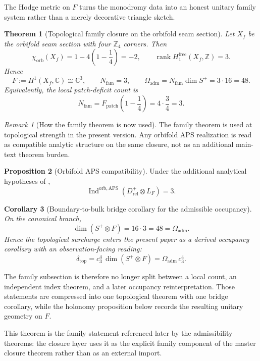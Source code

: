 \documentclass[11pt,a4paper]{article}
\newtheorem{theorem}{Theorem}[section]
\newtheorem{corollary}[theorem]{Corollary}
\theoremstyle{definition}
\newtheorem{proposition}[theorem]{Proposition}
\theoremstyle{remark}
\newtheorem*{remark}{Remark}
\DeclareMathOperator{\rank}{rank}
\DeclareMathOperator{\Ind}{Ind}
\newcommand{\cthree}{c_3}
\newcommand{\deltatop}{\delta_{\mathrm{top}}}
\newcommand{\Oadm}{\Omega_{\mathrm{adm}}}
\begin{document}
The Hodge metric on $F$ turns the monodromy data into an honest unitary family system rather than a merely decorative triangle sketch.

\begin{theorem}[Topological family closure on the orbifold seam section]
\label{thm:topological-family-closure}
\label{thm:orbifold-aps-family-master}
Let $X_f$ be the orbifold seam section with four $\mathbb Z_4$ corners. Then
\[
\chi_{\mathrm{orb}}(X_f)=1-4\left(1-\frac14\right)=-2,
\qquad
\rank H^{\mathrm{free}}_1(X_f,\mathbb Z)=3.
\]
Hence
\[
F:=H^1(X_f,\mathbb C)\cong \mathbb C^3,
\qquad
N_{\mathrm{fam}}=3,
\qquad
\Oadm=N_{\mathrm{fam}}\dim S^+=3\cdot 16=48.
\]
Equivalently, the local patch-deficit count is
\[
N_{\mathrm{fam}}=F_{\mathrm{patch}}\!\left(1-\frac14\right)=4\cdot\frac34=3.
\]
\end{theorem}

\begin{remark}[How the family theorem is now used]
The family theorem is used at topological strength in the present version. Any orbifold APS
realization is read as compatible analytic structure on the same closure, not as an additional
main-text theorem burden.
\end{remark}

\begin{proposition}[Orbifold APS compatibility]
\label{prop:orbifold-aps-compatibility}
Under the additional analytical hypotheses of ,
\[
\Ind^{\mathrm{orb,APS}}(D_{\mathrm{rel}}^+\otimes L_F)=3.
\]
\end{proposition}

\begin{corollary}[Boundary-to-bulk bridge corollary for the admissible occupancy]
\label{cor:boundary-bulk-occupancy}
On the canonical branch,
\[
\dim(S^+\otimes F)=16\cdot 3=48=\Oadm.
\]
Hence the topological surcharge enters the present paper as a derived occupancy corollary with an
observation-facing reading:
\[
\deltatop
=
\cthree^4\,\dim(S^+\otimes F)
=
\Oadm\,\cthree^4.
\]
\end{corollary}

The family subsection is therefore no longer split between a local count, an independent index theorem, and a later occupancy reinterpretation. Those statements are compressed into one topological theorem with one bridge corollary, while the holonomy proposition below records the resulting unitary geometry on $F$.

This theorem is the family statement referenced later by the admissibility theorems: the closure layer uses it as the explicit family component of the master closure theorem rather than as an external import.
\end{document}
